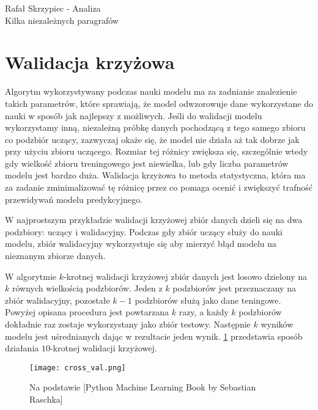 \documentclass[]{article}
\author{Rafa\l \vspace{1cm} Skrzypiec}
\theoremstyle{definition}
\begin{document}

{\large Rafał Skrzypiec - Analiza}\\
Kilka niezależnych paragrafów

\section{Walidacja krzyżowa}

Algorytm wykorzystywany podczas nauki modelu ma za zadnianie znalezienie takich parametrów, które sprawiają, że model odwzorowuje dane wykorzystane do nauki w sposób jak najlepszy z możliwych. Jeśli do walidacji modelu wykorzystamy inną, niezależną próbkę danych pochodzącą z tego samego zbioru co podzbiór uczący, zazwyczaj okaże się, że model nie działa aż tak dobrze jak przy użyciu zbioru uczącego. Rozmiar tej różnicy zwiększa się, szczególnie wtedy gdy wielkość zbioru treningowego jest niewielka, lub gdy liczba parametrów modelu jest bardzo duża.
Walidacja krzyżowa to metoda statystyczna, która ma za zadanie zminimalizować tę różnicę przez co pomaga ocenić i zwiększyć trafność przewidywań modelu predykcyjnego. 


W najprostszym przykładzie walidacji krzyżowej zbiór danych dzieli się na dwa podzbiory: uczący i walidacyjny. Podczas gdy zbiór uczący służy do nauki modelu, zbiór walidacyjny wykorzystuje się aby mierzyć błąd modelu na nieznanym zbiorze danych. 
		
W algorytmie $k$-krotnej walidacji krzyżowej zbiór danych jest losowo dzielony na $k$ równych wielkością podzbiorów. Jeden z $k$ podzbiorów jest przeznaczany na zbiór walidacyjny, pozostałe $k-1$ podzbiorów służą jako dane teningowe. Powyżej opisana procedura jest powtarzana $k$ razy, a każdy $k$ podzbiorów dokładnie raz zostaje wykorzystany jako zbiór testowy. Następnie $k$ wyników modelu jest uśrednianych dając w rezultacie jeden wynik. \figurename{} \ref{fig:cross-val} przedstawia sposób działania $10$-krotnej walidacji krzyżowej.

	\begin{figure}[htp!]
		\centering
		\texttt{[image: cross\_val.png]}
		\caption{Na podstawie [Python Machine Learning
			Book by Sebastian Raschka]}
		\label{fig:cross-val}
	\end{figure}
\end{document}
